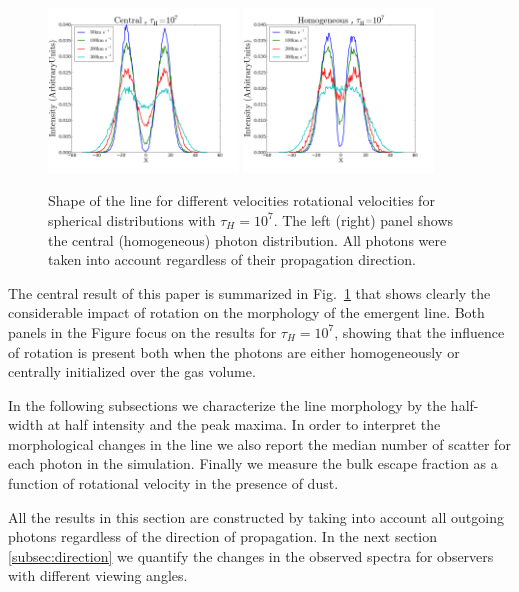 \documentclass[usenatbib]{mn2e}
\newcommand{\ly}{{\ifmmode{{\rm Ly}\alpha~}\else{Ly$\alpha$~}\fi}}
\begin{document}
\begin{figure}
  \includegraphics[width=0.45\textwidth]{SpectraDifVelocitiesCentral.png}
  \includegraphics[width=0.45\textwidth]{SpectraDifVelocitiesHOM.png}
\caption{Shape of the \ly line for
    different velocities rotational velocities for spherical
    distributions with $\tau_{H}=10^{7}$. The left (right) panel shows
    the central    (homogeneous) photon distribution. All photons were
    taken into     account regardless of their propagation
    direction.    \label{fig:differentvelocities}}  
\end{figure}


The central result of this paper is summarized in
Fig.~\ref{fig:differentvelocities} that shows clearly the considerable
impact of rotation on the morphology of the emergent \ly line. Both
panels in the Figure focus on the results for $\tau_{H}=10^{7}$,
showing that the influence of rotation is present both when the
photons are either homogeneously or centrally initialized over the gas
volume. 

In the following subsections we characterize the line morphology by
the half-width at half intensity and the peak maxima. In order to
interpret the morphological changes in the line we also report the
median number of scatter for each \ly photon in the
simulation. Finally we measure the bulk escape fraction as a function
of rotational velocity in the presence of dust.

All the results in this section are constructed by taking into
account all outgoing photons regardless of the direction of
propagation. In the next section \ref{subsec:direction} we quantify 
the changes in the observed spectra for observers with different
viewing angles. 
\end{document}
